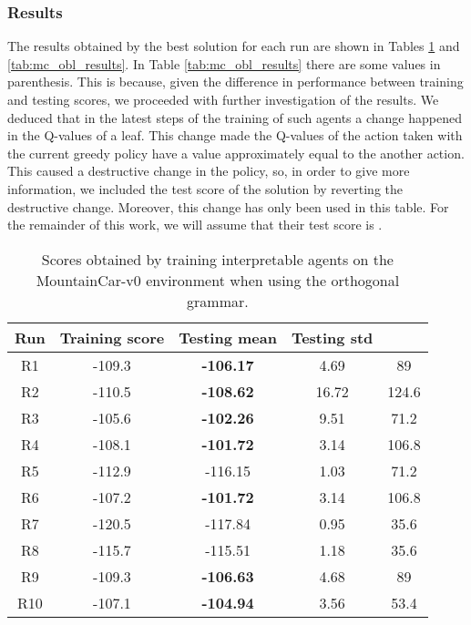 \documentclass[review,english]{elsarticle}
\begin{document}
\subsubsection{Results}
The results obtained by the best solution for each run are shown in Tables \ref{tab:mc_ort_results} and \ref{tab:mc_obl_results}.
In Table \ref{tab:mc_obl_results} there are some values in parenthesis. 
This is because, given the difference in performance between training and testing scores, we proceeded with further investigation of the results.
We deduced that in the latest steps of the training of such agents a change happened in the Q-values of a leaf.
This change made the Q-values of the action taken with the current greedy policy have a value approximately equal to the another action.
This caused a destructive change in the policy, so, in order to give more information, we included the test score of the solution by reverting the destructive change.
Moreover, this change has only been used in this table.
For the remainder of this work, we will assume that their test score is .
\begin{table}
    \centering
    \begin{tabular}{|c|c|c|c|c|} \hline  \textbf{Run} & \textbf{Training score} & \textbf{Testing mean} & \textbf{Testing std} & \textbf{} \\ \hline
        R1  & -109.3           & \textbf{-106.17}      & 4.69        & 89            \\
        R2  & -110.5           & \textbf{-108.62}      & 16.72       & 124.6         \\
        R3  & -105.6           & \textbf{-102.26}      & 9.51        & 71.2          \\
        R4  & -108.1           & \textbf{-101.72}      & 3.14        & 106.8         \\
        R5  & -112.9           & -116.15      & 1.03        & 71.2          \\
        R6  & -107.2           & \textbf{-101.72}      & 3.14        & 106.8         \\
        R7  & -120.5           & -117.84      & 0.95        & 35.6          \\
        R8  & -115.7           & -115.51      & 1.18        & 35.6          \\
        R9  & -109.3           & \textbf{-106.63}      & 4.68        & 89            \\
        R10  & -107.1           & \textbf{-104.94}      & 3.56        & 53.4          \\ \hline
    \end{tabular}
    \caption{Scores obtained by training interpretable agents on the MountainCar-v0 environment when using the orthogonal grammar.}
    \label{tab:mc_ort_results}
\end{table}
\end{document}
